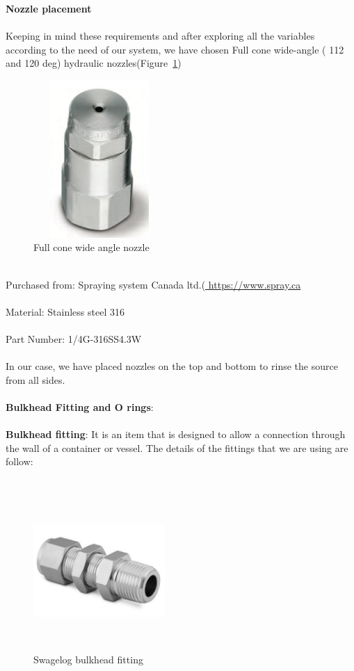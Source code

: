 \textbf{Nozzle placement}\\
\\
Keeping in mind these requirements and after exploring all the variables according to the need of our system, we have chosen Full cone wide-angle ( 112 and 120 deg) hydraulic nozzles(Figure~\ref{fig:nzl})
\begin{figure}[!htpb]
  \centering
  \includegraphics[width = 5cm, height=6cm ]{figures/nzl}
  \caption{Full cone wide angle nozzle}
   \label{fig:nzl}
\end{figure}
\\
Purchased from: Spraying system Canada ltd.(\url{ https://www.spray.ca}\\
\\
Material: Stainless steel 316\\
\\
Part Number: 1/4G-316SS4.3W \\
\\
In our case, we have placed nozzles on the top and bottom to rinse the source from all sides.\\
\\
\textbf{Bulkhead Fitting and O rings}: \\
\\
\textbf{Bulkhead fitting}:
It is an item that is designed to allow a connection through the wall of a container or vessel. The details of the fittings that we are using are follow:\\
\\
\begin{figure}[!htpb]
  \centering
  \includegraphics[width = 5cm, height=6cm ]{figures/ftng}
  \caption{Swagelog bulkhead fitting}
  \label{fig:ftng}
\end{figure}

